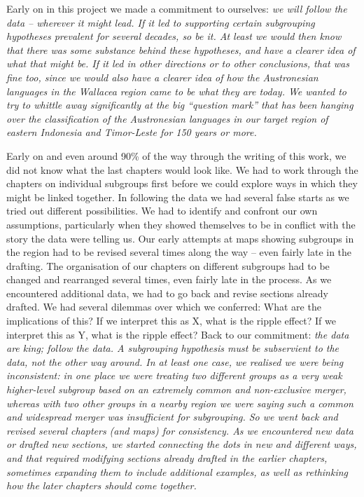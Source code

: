 Early on in this project we made a commitment to ourselves: \it{we will follow the data -- wherever it might lead}.
If it led to supporting certain subgrouping hypotheses prevalent for several decades, so be it.
At least we would then know that there was some substance behind these hypotheses,
and have a clearer idea of what that might be.
If it led in other directions or to other conclusions, that was fine too,
since we would also have a clearer idea of how the Austronesian languages in the Wallacea region came to be what they are today.
We wanted to try to whittle away significantly at the big ``question mark''
that has been hanging over the classification of the Austronesian
languages in our target region of eastern Indonesia and Timor-Leste for 150 years or more.

Early on and even around 90{\%} of the way through the writing of this work,
we did not know what the last chapters would look like.
We had to work through the chapters on individual subgroups first before we could explore ways in which they might be linked together.
In following the data we had several false starts as we tried out different possibilities.
We had to identify and confront our own assumptions,
particularly when they showed themselves to be in conflict with the story the data were telling us.
Our early attempts at maps showing subgroups in the region had to be revised several times along the way -- even fairly late in the drafting.
The organisation of our chapters on different subgroups had to be changed and rearranged several times, even fairly late in the process.
As we encountered additional data, we had to go back and revise sections already drafted.
We had several dilemmas over which we conferred: What are the implications of this? If we interpret this as X,
what is the ripple effect? If we interpret this as Y,
what is the ripple effect? Back to our commitment: \it{the data are king; follow the data.
A subgrouping hypothesis must be subservient to the data,
not the other way around.} In at least one case,
we realised we were being inconsistent:
in one place we were treating two different groups as a very weak higher-level
subgroup based on an extremely common and non-exclusive merger,
whereas with two other groups in a nearby region we were saying
such a common and widespread merger was insufficient for subgrouping.
So we went back and revised several chapters (and maps) for consistency.
As we encountered new data or drafted new sections,
we started connecting the dots in new and different ways,
and that required modifying sections already drafted in the earlier chapters,
sometimes expanding them to include additional examples,
as well as rethinking how the later chapters should come together.

